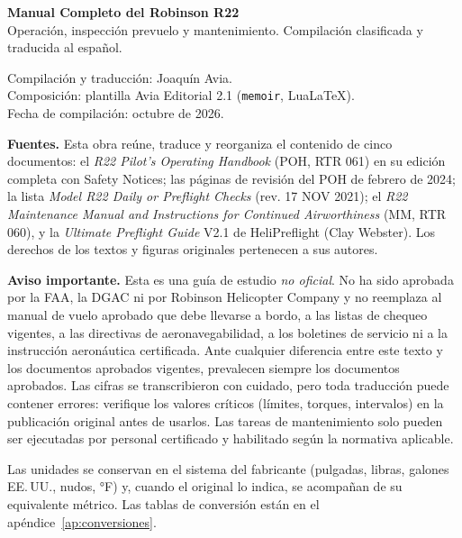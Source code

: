 \thispagestyle{empty}
\vspace*{\fill}
\begin{small}
\noindent\textbf{Manual Completo del Robinson R22}\\
Operación, inspección prevuelo y mantenimiento. Compilación clasificada y traducida al español.

\medskip
\noindent Compilación y traducción: Joaquín Avia.\\
Composición: plantilla Avia Editorial 2.1 (\texttt{memoir}, LuaLaTeX).\\
Fecha de compilación: octubre de 2026.

\bigskip
\noindent\textbf{Fuentes.} Esta obra reúne, traduce y reorganiza el contenido de cinco documentos: el \emph{R22 Pilot's Operating Handbook} (POH, RTR 061) en su edición completa con Safety Notices; las páginas de revisión del POH de febrero de 2024; la lista \emph{Model R22 Daily or Preflight Checks} (rev. 17 NOV 2021); el \emph{R22 Maintenance Manual and Instructions for Continued Airworthiness} (MM, RTR 060), y la \emph{Ultimate Preflight Guide} V2.1 de HeliPreflight (Clay Webster). Los derechos de los textos y figuras originales pertenecen a sus autores.

\bigskip
\noindent\textbf{Aviso importante.} Esta es una guía de estudio \emph{no oficial}. No ha sido aprobada por la FAA, la DGAC ni por Robinson Helicopter Company y no reemplaza al manual de vuelo aprobado que debe llevarse a bordo, a las listas de chequeo vigentes, a las directivas de aeronavegabilidad, a los boletines de servicio ni a la instrucción aeronáutica certificada. Ante cualquier diferencia entre este texto y los documentos aprobados vigentes, prevalecen siempre los documentos aprobados. Las cifras se transcribieron con cuidado, pero toda traducción puede contener errores: verifique los valores críticos (límites, torques, intervalos) en la publicación original antes de usarlos. Las tareas de mantenimiento solo pueden ser ejecutadas por personal certificado y habilitado según la normativa aplicable.

\bigskip
\noindent Las unidades se conservan en el sistema del fabricante (pulgadas, libras, galones EE.\,UU., nudos, °F) y, cuando el original lo indica, se acompañan de su equivalente métrico. Las tablas de conversión están en el apéndice~\ref{ap:conversiones}.
\end{small}
\cleardoublepage
